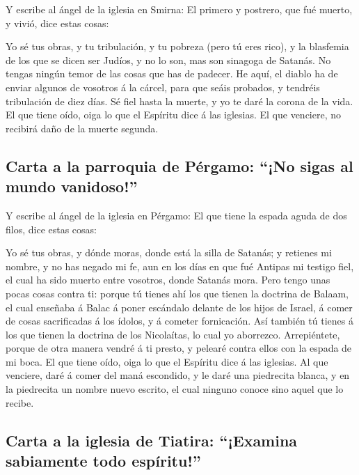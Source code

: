  Y escribe al ángel de la iglesia en Smirna: El primero y
postrero, que fué muerto, y vivió, dice estas cosas:

 Yo sé tus obras, y tu tribulación, y tu pobreza (pero tú
eres rico), y la blasfemia de los que se dicen ser Judíos, y no lo son,
mas son sinagoga de Satanás.  No tengas ningún temor de
las cosas que has de padecer. He aquí, el diablo ha de enviar algunos de
vosotros á la cárcel, para que seáis probados, y tendréis tribulación de
diez días. Sé fiel hasta la muerte, y yo te daré la corona de la vida.
 El que tiene oído, oiga lo que el Espíritu dice á las
iglesias. El que venciere, no recibirá daño de la muerte segunda.

\hypertarget{carta-a-la-parroquia-de-puxe9rgamo-no-sigas-al-mundo-vanidoso}{%
\subsection{Carta a la parroquia de Pérgamo: ``¡No sigas al mundo
vanidoso!''}\label{carta-a-la-parroquia-de-puxe9rgamo-no-sigas-al-mundo-vanidoso}}

 Y escribe al ángel de la iglesia en Pérgamo: El que
tiene la espada aguda de dos filos, dice estas cosas:

 Yo sé tus obras, y dónde moras, donde está la silla de
Satanás; y retienes mi nombre, y no has negado mi fe, aun en los días en
que fué Antipas mi testigo fiel, el cual ha sido muerto entre vosotros,
donde Satanás mora.  Pero tengo unas pocas cosas contra
ti: porque tú tienes ahí los que tienen la doctrina de Balaam, el cual
enseñaba á Balac á poner escándalo delante de los hijos de Israel, á
comer de cosas sacrificadas á los ídolos, y á cometer fornicación.
 Así también tú tienes á los que tienen la doctrina de
los Nicolaítas, lo cual yo aborrezco.  Arrepiéntete,
porque de otra manera vendré á ti presto, y pelearé contra ellos con la
espada de mi boca.  El que tiene oído, oiga lo que el
Espíritu dice á las iglesias. Al que venciere, daré á comer del maná
escondido, y le daré una piedrecita blanca, y en la piedrecita un nombre
nuevo escrito, el cual ninguno conoce sino aquel que lo recibe.

\hypertarget{carta-a-la-iglesia-de-tiatira-examina-sabiamente-todo-espuxedritu}{%
\subsection{Carta a la iglesia de Tiatira: ``¡Examina sabiamente todo
espíritu!''}\label{carta-a-la-iglesia-de-tiatira-examina-sabiamente-todo-espuxedritu}}


